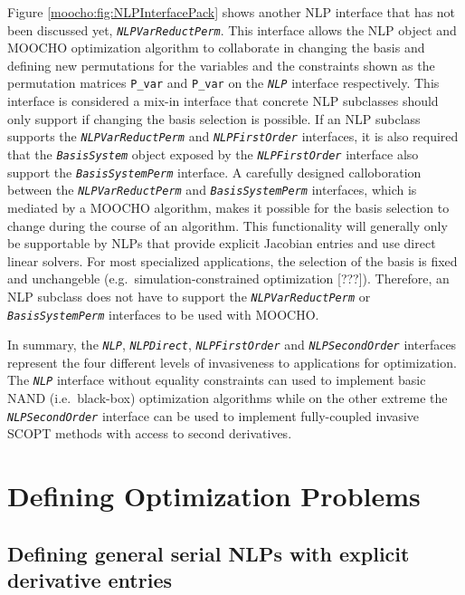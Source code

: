 \documentclass[pdf,ps2pdf,11pt]{SANDreport}
\begin{document}
Figure {}\ref{moocho:fig:NLPInterfacePack} shows another NLP interface that has
not been discussed yet, {}\texttt{\textit{NLP\-Var\-Reduct\-Perm}}.  This
interface allows the NLP object and MOOCHO optimization algorithm to
collaborate in changing the basis and defining new permutations for the
variables and the constraints shown as the permutation matrices
{}\texttt{P\_var} and {}\texttt{P\_var} on the {}\texttt{\textit{NLP}}
interface respectively.  This interface is considered a mix-in interface that
concrete NLP subclasses should only support if changing the basis selection is
possible.  If an NLP subclass supports the
{}\texttt{\textit{NLP\-Var\-Reduct\-Perm}} and
{}\texttt{\textit{NLP\-First\-Order}} interfaces, it is also required that the
{}\texttt{\textit{Basis\-System}} object exposed by the
{}\texttt{\textit{NLP\-First\-Order}} interface also support the
{}\texttt{\textit{Basis\-System\-Perm}} interface.  A carefully designed
calloboration between the {}\texttt{\textit{NLP\-Var\-Reduct\-Perm}} and
{}\texttt{\textit{Basis\-System\-Perm}} interfaces, which is mediated by a
MOOCHO algorithm, makes it possible for the basis selection to change during
the course of an algorithm.  This functionality will generally only be
supportable by NLPs that provide explicit Jacobian entries and use direct
linear solvers.  For most specialized applications, the selection of the basis
is fixed and unchangeble (e.g.\ simulation-constrained optimization [???]).
Therefore, an NLP subclass does not have to support the
{}\texttt{\textit{NLP\-Var\-Reduct\-Perm}} or
{}\texttt{\textit{Basis\-System\-Perm}} interfaces to be used with MOOCHO.

In summary, the {}\texttt{\textit{NLP}}, {}\texttt{\textit{NLP\-Direct}},
{}\texttt{\textit{NLP\-First\-Order}} and
{}\texttt{\textit{NLP\-Second\-Order}} interfaces represent the four different
levels of invasiveness to applications for optimization.  The
{}\texttt{\textit{NLP}} interface without equality constraints can used to
implement basic NAND (i.e.\ black-box) optimization algorithms while on the
other extreme the {}\texttt{\textit{NLP\-Second\-Order}} interface can be used
to implement fully-coupled invasive SCOPT methods with access to second
derivatives.

%
\section{Defining Optimization Problems}
%

%
\subsection{Defining general serial NLPs with explicit derivative entries}
%
\end{document}
